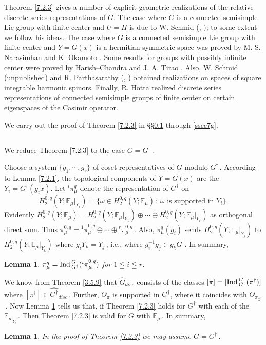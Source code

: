 \documentclass{conm-p-l}
\newtheorem{lemma}[equation]{Lemma}
\def\Ind{{\rm Ind\,}}
\def\E{\mathbb{E}}
\begin{document}
Theorem \ref{7.2.3} gives a number of explicit geometric realizations
of the relative discrete series representations of $G$.  The case
where $G$ is a connected semisimple Lie group with finite center and
$U = H$ is due to W. Schmid (\cite{S1971}, \cite{S1976}); to some extent 
we follow his ideas.
The case where $G$ is a connected semisimple Lie group with finite center
and $Y = G(x)$ is a hermitian symmetric space was proved by
M. S. Narasimhan and K. Okamoto \cite{NO1970}.  Some results for groups with
possibly infinite center were proved by Harish--Chandra \cite{HC1956b} and
J. A. Tirao \cite{T1974}.  Also, W. Schmid (unpublished) and R. Parthasarathy 
(\cite{P1971}, \cite{P1972}) obtained realizations on spaces of square 
integrable harmonic spinors.  Finally, R. Hotta \cite{H1971} realized 
discrete series
representations of connected semisimple groups of finite center on
certain eigenspaces of the Casimir operator.

We carry out the proof of Theorem \ref{7.2.3} in \S\S \ref{ssec7c} 
through \ref{ssec7g}.  

\subsection{}\label{ssec7c}\setcounter{equation}{0}
We reduce Theorem \ref{7.2.3} to the case $G = G^\dagger$\,.

Choose a system $\{g_1, \cdots , g_r\}$ of coset representatives
of $G$ modulo $G^\dagger$\,.  According to Lemma \ref{7.2.1}, the topological
components of $Y = G(x)$ are the $Y_i = G^\dagger(g_ix)$.  Let $^i\pi_\mu^q$
denote the representation of $G^\dagger$ on
$$
H_2^{0,q}(Y;\E_\mu|_{Y_i}) = \{\omega \in H_2^{0,q}(Y;\E_\mu)\,
	:\, \omega \text{ is supported in } Y_i\}.
$$
Evidently $H_2^{0,q}(Y;\E_\mu) = H_2^{0,q}(Y;\E_\mu|_{Y_1}) \oplus
	\cdots \oplus H_2^{0,q}(Y;\E_\mu|_{Y_r})$ as orthogonal direct sum.
Thus $\pi_\mu^{0,q} = {^1\pi}_\mu^{0,q} \oplus \cdots \oplus 
{^r\pi}_\mu^{0,q}$\,.  Also, $\pi_\mu^q(g_i)$ sends $H_2^{0,q}(Y;\E_\mu|_{Y_j})$
to $H_2^{0,q}(Y;\E_\mu|_{Y_k})$ where $g_iY_k = Y_j$\,, i.e., where
$g_i^{-1}g_j \in g_kG^\dagger$.  In summary,

\begin{lemma}\label{7.3.1}
$\pi_\mu^q = \Ind_{G^\dagger}^G
({^i\pi}_\mu^{0,q})$ for $1 \leqq i \leqq r$.
\end{lemma}

We know from Theorem \ref{3.5.9} that $\widehat{G}_{disc}$ consists of the
classes $[\pi] = [\Ind_{G^\dagger}^G(\pi^\dagger)]$ where
$[\pi^\dagger] \in \widehat{G^\dagger}_{disc}$\,.  Further, $\Theta_\pi$
is supported in $G^\dagger$, where it coincides with 
$\Theta_{\pi_{G^\dagger}}$\,.  Now Lemma \ref{7.3.1} tells us that, if Theorem
\ref{7.2.3} holds for $G^\dagger$ with each of the $\E_{\mu|_{Y_i}}$\,.
Then Theorem \ref{7.2.3} is valid for $G$ with $\E_\mu$\,.  In summary,
\begin{lemma}\label{7.3.2}
In the proof of {\rm Theorem \ref{7.2.3}}
we may assume $G = G^\dagger$\,.
\end{lemma}
\end{document}
